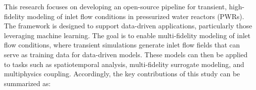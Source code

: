 \documentclass[review]{elsarticle}
\theoremstyle{definition}
\theoremstyle{definition}
\theoremstyle{remark}
\begin{document}


This research focuses on developing an open-source pipeline for transient, high-fidelity modeling of inlet flow conditions in pressurized water reactors (PWRs). The framework is designed to support data-driven applications, particularly those leveraging machine learning. The goal is to enable multi-fidelity modeling of inlet flow conditions, where transient simulations generate inlet flow fields that can serve as training data for data-driven models. These models can then be applied to tasks such as spatiotemporal analysis, multi-fidelity surrogate modeling, and multiphysics coupling. Accordingly, the key contributions of this study can be summarized as:
\end{document}
